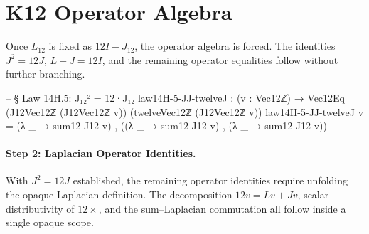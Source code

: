 \documentclass[11pt,a4paper]{book}
\def\texorpdfstring#1#2{#2}%
\begin{document}
\section{K\texorpdfstring{$_{12}$}{12} Operator Algebra}

Once $L_{12}$ is fixed as $12I - J_{12}$, the operator algebra is forced.
The identities $J^2 = 12J$,
$L + J = 12I$, and the remaining operator equalities follow without further
branching.

\begin{code}
-- § Law 14H.5: J₁₂² = 12·J₁₂
law14H-5-JJ-twelveJ : (v : Vec12ℤ) → Vec12Eq (J12Vec12ℤ (J12Vec12ℤ v)) (twelveVec12ℤ (J12Vec12ℤ v))
law14H-5-JJ-twelveJ v =
  (λ _ → sum12-J12 v) ,
  ((λ _ → sum12-J12 v) ,
   (λ _ → sum12-J12 v))
\end{code}

\paragraph{Step 2: Laplacian Operator Identities.}
With $J^2 = 12J$ established, the remaining operator identities require
unfolding the opaque Laplacian definition. The decomposition
$12v = Lv + Jv$, scalar distributivity of $12{\times}$, and the
sum--Laplacian commutation all follow inside a single opaque scope.
\end{document}
